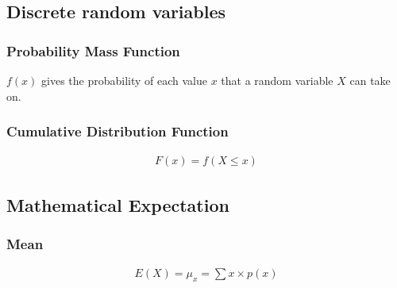 \documentclass{article}
\begin{document}
\begin{multicols*}{2}
\subsection{Discrete random variables}

\subsubsection{Probability Mass Function}
$f(x)$ gives the probability of each value $x$ that a random variable $X$ can take on.

\subsubsection{Cumulative Distribution Function}
\begin{align*}
    F(x) = f(X \leq x)
\end{align*}

\subsection{Mathematical Expectation}

\subsubsection{Mean}
\begin{align*}
    E(X) = \mu_x = \sum x \times p(x)
\end{align*}

\end{multicols*}
\end{document}
